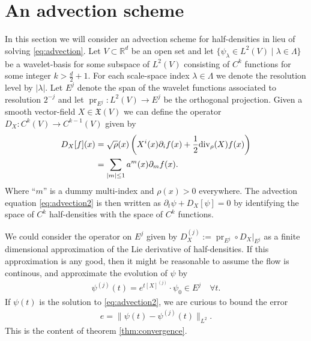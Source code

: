 \documentclass[letterpaper, 12 pt]{amsart}
\DeclareMathOperator{\pr}{pr}
\begin{document}


\section{An advection scheme}
\label{sec:scheme}
  In this section we will consider an advection scheme
  for half-densities in lieu of solving \eqref{eq:advection}.
  Let $V \subset \mathbb{R}^d$ be an open set and let
  $\{ \psi_\lambda \in L^2(V)  \mid \lambda \in \Lambda\}$
  be a wavelet-basis for some
  subspace of $L^2(V)$ consisting of $C^k$ functions for some
  integer $k > \frac{d}{2} + 1$.
  For each scale-space index $\lambda \in \Lambda$
  we denote the resolution level by $|\lambda|$.
  Let $E^j$ denote the span of the wavelet functions
  associated to resolution $2^{-j}$ and let 
  $\pr_{E^j}: L^2(V) \to E^j$ be the orthogonal projection.
  Given a smooth vector-field $X \in \mathfrak{X}(V)$
  we can define the operator $D_X : C^k(V) \to C^{k-1}(V)$ 
  given by
  \begin{align*}
    D_X[f](x) &=  \sqrt{\rho}(x) \left(  X^i (x) \partial_if(x) 
      + \frac{1}{2} {\rm div}_{\rho}(X) f(x) \right)\\
    &= \sum_{ | m | \leq 1 } a^m(x) \partial_{m}f(x).
  \end{align*}
  Where ``$m$'' is a dummy multi-index and $\rho(x) > 0$ everywhere.
  The advection equation \eqref{eq:advection2} is then written
  as $\partial_t \psi + D_X[\psi] = 0$ by identifying the space
  of $C^k$ half-densities with the space of $C^k$ functions.

  We could consider the operator on $E^j$ given by 
  $D_X^{(j)} := \pr_{E^j} \circ \left. D_X \right|_{E^j}$
  as a finite dimensional approximation of the Lie derivative of half-densities.
  If this approximation is any good, then it might be reasonable to assume
  the flow is continous, and approximate the evolution of $\psi$ by
  \begin{align*}
    \psi^{(j)}(t) = e^{t [X]^{(j)} } \cdot \psi_0 \in E^j \quad \forall t.
  \end{align*}
  If $\psi(t)$ is the solution to \eqref{eq:advection2},
  we are curious to bound the error
  \begin{align*}
    e = \| \psi(t) - \psi^{(j)}(t) \|_{L^2}.
  \end{align*}
  This is the content of theorem \ref{thm:convergence}.
\end{document}
